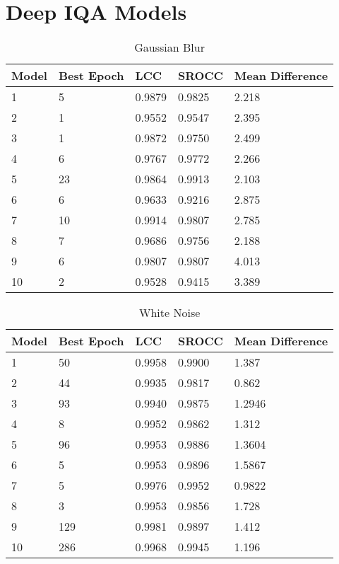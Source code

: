 \section{Deep IQA Models}


\begin{table}[h]
\centering
\caption{Gaussian Blur}
\label{my-label}
\begin{tabular}{|l|l|l|l|l|}
\hline
Model & Best Epoch & LCC    & SROCC  & Mean Difference \\ \hline
1     & 5          & 0.9879 & 0.9825 & 2.218           \\ \hline
2     & 1          & 0.9552 & 0.9547 & 2.395           \\ \hline
3     & 1          & 0.9872 & 0.9750 & 2.499           \\ \hline
4     & 6          & 0.9767 & 0.9772 & 2.266           \\ \hline
5     & 23         & 0.9864 & 0.9913 & 2.103           \\ \hline
6     & 6          & 0.9633 & 0.9216 & 2.875           \\ \hline
7     & 10         & 0.9914 & 0.9807 & 2.785           \\ \hline
8     & 7          & 0.9686 & 0.9756 & 2.188           \\ \hline
9     & 6          & 0.9807 & 0.9807 & 4.013           \\ \hline
10    & 2          & 0.9528 & 0.9415 & 3.389           \\ \hline
\end{tabular}
\end{table}

\begin{table}[h]
\centering
\caption{White Noise}
\label{my-label}
\begin{tabular}{|l|l|l|l|l|}
\hline
Model & Best Epoch & LCC    & SROCC  & Mean Difference \\ \hline
1     & 50         & 0.9958 & 0.9900 & 1.387           \\ \hline
2     & 44         & 0.9935 & 0.9817 & 0.862           \\ \hline
3     & 93         & 0.9940 & 0.9875 & 1.2946          \\ \hline
4     & 8          & 0.9952 & 0.9862 & 1.312           \\ \hline
5     & 96         & 0.9953 & 0.9886 & 1.3604          \\ \hline
6     & 5          & 0.9953 & 0.9896 & 1.5867          \\ \hline
7     & 5          & 0.9976 & 0.9952 & 0.9822          \\ \hline
8     & 3          & 0.9953 & 0.9856 & 1.728           \\ \hline
9     & 129        & 0.9981 & 0.9897 & 1.412           \\ \hline
10    & 286        & 0.9968 & 0.9945 & 1.196           \\ \hline
\end{tabular}
\end{table}

